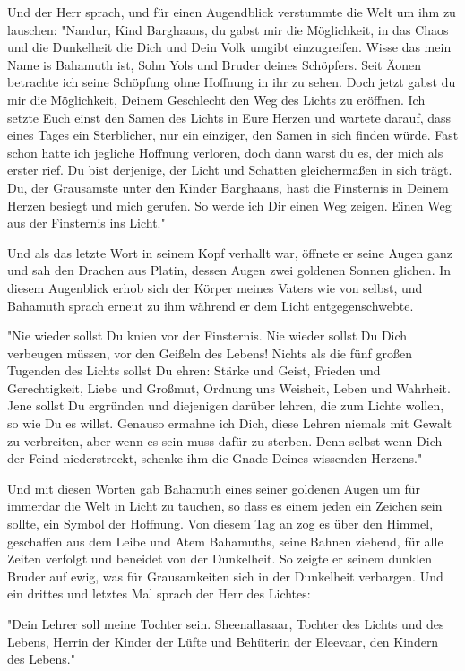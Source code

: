 \documentclass[10pt,twoside,BCOR=12mm,DIV=classic]{scrbook}
\begin{document}
Und der Herr sprach, und für einen Augendblick verstummte die Welt um ihm zu
lauschen: "Nandur, Kind Barghaans, du gabst mir die Möglichkeit, in das Chaos
und die Dunkelheit die Dich und Dein Volk umgibt einzugreifen. Wisse das mein
Name is Bahamuth ist, Sohn Yols und Bruder deines Schöpfers. Seit Äonen
betrachte ich seine Schöpfung ohne Hoffnung in ihr zu sehen. Doch jetzt gabst du
mir die Möglichkeit, Deinem Geschlecht den Weg des Lichts zu eröffnen. Ich
setzte Euch einst den Samen des Lichts in Eure Herzen und wartete darauf, dass
eines Tages ein Sterblicher, nur ein einziger, den Samen in sich finden würde.
Fast schon hatte ich jegliche Hoffnung verloren, doch dann warst du es, der mich
als erster rief. Du bist derjenige, der Licht und Schatten gleichermaßen in sich
trägt. Du, der Grausamste unter den Kinder Barghaans, hast die Finsternis in
Deinem Herzen besiegt und mich gerufen. So werde ich Dir einen Weg zeigen. Einen
Weg aus der Finsternis ins Licht."

Und als das letzte Wort in seinem Kopf verhallt war, öffnete er seine Augen ganz
und sah den Drachen aus Platin, dessen Augen zwei goldenen Sonnen glichen. In
diesem Augenblick erhob sich der Körper meines Vaters wie von selbst, und
Bahamuth sprach erneut zu ihm während er dem Licht entgegenschwebte.

"Nie wieder sollst Du knien vor der Finsternis. Nie wieder sollst Du Dich
verbeugen müssen, vor den Geißeln des Lebens!
Nichts als die fünf großen Tugenden des Lichts sollst Du ehren:
Stärke und Geist,
Frieden und Gerechtigkeit,
Liebe und Großmut,
Ordnung uns Weisheit,
Leben und Wahrheit.
Jene sollst Du ergründen und diejenigen darüber lehren, die zum Lichte wollen,
so wie Du es willst. Genauso ermahne ich Dich, diese Lehren niemals mit Gewalt
zu verbreiten, aber wenn es sein muss dafür zu sterben. Denn selbst wenn Dich
der Feind niederstreckt, schenke ihm die Gnade Deines wissenden Herzens."

Und mit diesen Worten gab Bahamuth eines seiner goldenen Augen um für immerdar
die Welt in Licht zu tauchen, so dass es einem jeden ein Zeichen sein sollte,
ein Symbol der Hoffnung. Von diesem Tag an zog es über den Himmel, geschaffen
aus dem Leibe und Atem Bahamuths, seine Bahnen ziehend, für alle Zeiten verfolgt
und beneidet von der Dunkelheit. So zeigte er seinem dunklen Bruder auf ewig,
was für Grausamkeiten sich in der Dunkelheit verbargen. Und ein drittes und
letztes Mal sprach der Herr des Lichtes:

"Dein Lehrer soll meine Tochter sein. Sheenallasaar, Tochter des Lichts und des
Lebens, Herrin der Kinder der Lüfte und Behüterin der Eleevaar, den Kindern des
Lebens."
\end{document}
